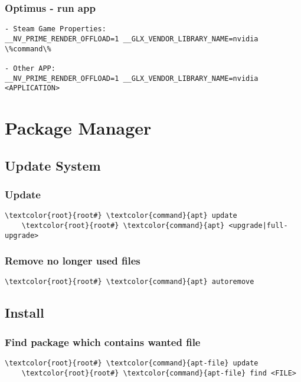 \documentclass[10pt, a4paper, onecolumn, openany]{book} %
\begin{document}
\subsection{Optimus - run app}
\begin{Verbatim}[commandchars=\\\{\}]
- Steam Game Properties:
__NV_PRIME_RENDER_OFFLOAD=1 __GLX_VENDOR_LIBRARY_NAME=nvidia \%command\%

- Other APP:
__NV_PRIME_RENDER_OFFLOAD=1 __GLX_VENDOR_LIBRARY_NAME=nvidia <APPLICATION>
\end{Verbatim}



\chapter{Package Manager}
\section{Update System}
\subsection{Update}
\begin{Verbatim}[commandchars=\\\{\}]
    \textcolor{root}{root#} \textcolor{command}{apt} update
    \textcolor{root}{root#} \textcolor{command}{apt} <upgrade|full-upgrade>
\end{Verbatim}
\subsection{Remove no longer used files}
\begin{Verbatim}[commandchars=\\\{\}]
    \textcolor{root}{root#} \textcolor{command}{apt} autoremove
\end{Verbatim}

\section{Install}
\subsection{Find package which contains wanted file}
\begin{Verbatim}[commandchars=\\\{\}]
    \textcolor{root}{root#} \textcolor{command}{apt-file} update
    \textcolor{root}{root#} \textcolor{command}{apt-file} find <FILE>
\end{Verbatim}
\end{document}
